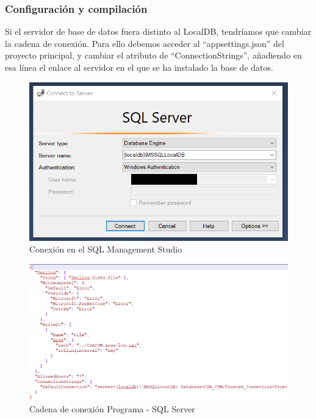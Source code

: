\subsubsection{Configuración y compilación}
Si el servidor de base de datos fuera distinto al LocalDB, tendríamos que cambiar la cadena de conexión. Para ello debemos acceder al ``appsettings.json'' del proyecto principal, y cambiar el atributo de ``ConnectionStrings'', añadiendo en esa línea el enlace al servidor en el que se ha instalado la base de datos.

\begin{figure}[h]
    \centering
    \includegraphics[width=\linewidth]{img/ManualProgramador/SQLConnect.png}
    \caption{Conexión en el SQL Management Studio}
\end{figure}
\begin{figure}
    \centering
    \includegraphics[width=\linewidth]{img/ManualProgramador/Settings.png}
    \caption{Cadena de conexión Programa - SQL Server}
    
\end{figure}

